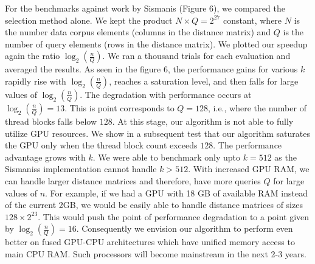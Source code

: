 \documentclass[10pt]{article}
\begin{document}
For the benchmarks against work by Sismanis (Figure 6), we compared the selection method alone. We kept the product $N \times Q = 2^{27}$ constant, where $N$ is the number data corpus elements (columns in the distance matrix) and $Q$ is the number of query elements (rows in the distance matrix). We plotted our speedup again the ratio $\log_2 \left(\frac{n}{Q}\right)$.  We ran a thousand trials for each evaluation and averaged the results. As seen in the figure 6, the performance gains for various $k$ rapidly rise with  $\log_2\left( \frac{n}{Q} \right)$, reaches a saturation level, and then falls for large values of  $\log_2\left( \frac{n}{Q} \right)$. The degradation with performance occurs at  $\log_2\left( \frac{n}{Q} \right)=13$. This is point corresponds to $Q=128$, i.e., where the number of thread blocks falls below $128$. At this stage, our algorithm is not able to fully utilize GPU resources. We show in a subsequent test that our algorithm saturates the GPU only when the thread block count exceeds $128$. The performance advantage grows with $k$. We were able to benchmark only upto $k=512$ as the Sismaniss implementation cannot handle $k>512$.  With increased GPU RAM, we can handle larger distance matrices and therefore, have more queries $Q$ for large values of $n$. For example, if we had a GPU with 18 GB of available RAM instead of the current 2GB, we would be easily able to handle distance matrices of sizes $128 \times 2^23$. This would push the point of performance degradation to a point given by $\log_2\left(\frac{n}{Q}\right) = 16$.  Consequently we envision our algorithm to perform even better on fused GPU-CPU architectures which have unified memory access to main CPU RAM. Such processors will become mainstream in the next 2-3 years.\\
\end{document}
